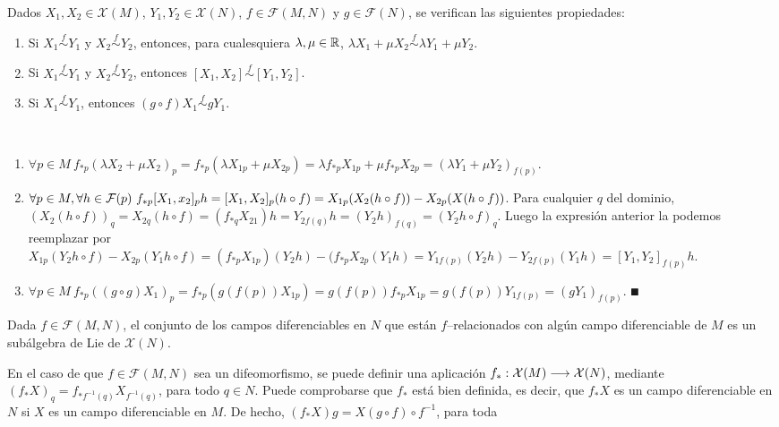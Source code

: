 \documentclass[Cursovd_portada.tex]{subfiles}
\begin{document}
\begin{prop}
Dados $X_1,X_2\in\mathcal{X}(M)$, $Y_1,Y_2\in\mathcal{X}(N)$, $f\in\mathcal{F}(M,N)$ y $g\in\mathcal{F}(N)$, se
verifican las siguientes propiedades:
\begin{enumerate}
\item Si $X_1\stackrel{f}\sim Y_1$ y $X_2\stackrel{f}\sim Y_2$, entonces, para cualesquiera $\lambda,\mu\in\mathbb{R}$,
$\lambda X_1+\mu X_2\stackrel{f}\sim \lambda Y_1+\mu Y_2$.
\item Si $X_1\stackrel{f}\sim Y_1$ y $X_2\stackrel{f}\sim Y_2$, entonces $[X_1,X_2]\stackrel{f}\sim [Y_1,Y_2]$.
\item Si $X_1\stackrel{f}\sim Y_1$, entonces $(g\circ f)X_1\stackrel{f}\sim gY_1$.
\end{enumerate}
\end{prop}
\begin{dem}\
\begin{enumerate}
\item $\forall p\in M\ f_{*p}(\lambda X_2+\mu X_2)_p=f_{*p}(\lambda X_{1p}+\mu X_{2p})=\lambda f_{*p}X_{1p}+\mu f_{*p}X_{2p}=(\lambda Y_1 +\mu Y_2)_{f(p)}$.
\item $\forall p\in M,\forall h\in\calF(p)\ f_{*p}[X_1,x_2]_ph=[X_1,X_2]_p(h\circ f)=X_{1p}(X_2(h\circ f))-X_{2p}(X(h\circ f))$. Para cualquier $q$ del dominio, $(X_2(h\circ f))_q=X_{2q}(h\circ f)=(f_{*q}X_{21})h=Y_{2f(q)}h=(Y_2h)_{f(q)}=(Y_2h\circ f)_q$. Luego la expresión anterior la podemos reemplazar por $X_{1p}(Y_2h\circ f)-X_{2p}(Y_1h\circ f)=(f_{*p}X_{1p})(Y_2h)-(f_{*p}X_{2p}(Y_1h)=Y_{1f(p)}(Y_2h)-Y_{2f(p)}(Y_1h)=[Y_1,Y_2]_{f(p)}h.$
\item $\forall p\in M\ f_{*p}((g\circ g)X_1)_p=f_{*p}(g(f(p))X_{1p})=g(f(p))f_{*p}X_{1p}=g(f(p))Y_{1f(p)}=(gY_1)_{f(p)}$. $\QED$
\end{enumerate}
\end{dem}
\begin{coro}
Dada $f\in\mathcal{F}(M,N)$, el conjunto de los campos diferenciables en $N$ que están $f$--relacionados con algún
campo diferenciable de $M$ es un subálgebra de Lie de $\mathcal{X}(N)$.
\end{coro}
En el caso de que $f\in\mathcal{F}(M,N)$ sea un difeomorfismo, se
puede definir una aplicación
$f_*:\mathcal{X}(M)\longrightarrow\mathcal{X}(N)$, mediante
$(f_*X)_q=f_{*f^{-1}(q)}X_{f^{-1}(q)}$, para todo $q\in N$. Puede
comprobarse que $f_*$ está bien definida, es decir, que $f_*X$
es un campo diferenciable en $N$ si $X$ es un campo diferenciable
en $M$. De hecho, $(f_*X)g=X(g\circ f)\circ f^{-1}$, para toda
\end{document}
